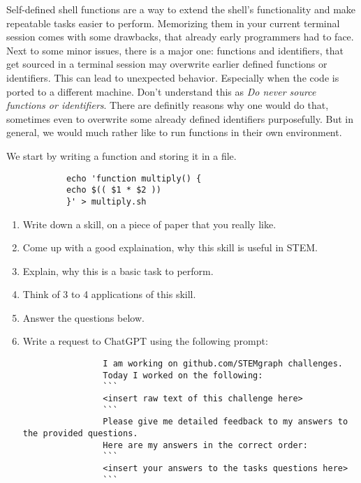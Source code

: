 
\begin{challenge}

    \begin{chadescription}
        Self-defined shell functions are a way to extend the shell's functionality and make repeatable tasks easier to perform.
        Memorizing them in your current terminal session comes with some drawbacks, that already early programmers had to face.
        Next to some minor issues, there is a major one: functions and identifiers, that get sourced in a terminal session may overwrite earlier defined functions or identifiers.
        This can lead to unexpected behavior.
        Especially when the code is ported to a different machine.
        Don't understand this as \textit{Do never source functions or identifiers}.
        There are definitly reasons why one would do that, sometimes even to overwrite some already defined identifiers purposefully.
        But in general, we would much rather like to run functions in their own environment.
    \end{chadescription}

    \begin{task}
        We start by writing a function and storing it in a file.
        \begin{lstlisting}
            echo 'function multiply() {
            echo $(( $1 * $2 ))
            }' > multiply.sh
        \end{lstlisting}
        
        \begin{enumerate}
            \item Write down a skill, on a piece of paper that you really like.
            \item Come up with a good explaination, why this skill is useful in STEM. 
            \item Explain, why this is a basic task to perform.
            \item Think of 3 to 4 applications of this skill.
            \item Answer the questions below.
            \item Write a request to ChatGPT using the following prompt:
            \begin{lstlisting}
                I am working on github.com/STEMgraph challenges.
                Today I worked on the following:
                ```
                <insert raw text of this challenge here>
                ```
                Please give me detailed feedback to my answers to the provided questions.
                Here are my answers in the correct order:
                ```
                <insert your answers to the tasks questions here>
                ```
            \end{lstlisting}
        \end{enumerate}


\end{task}
\end{challenge}
